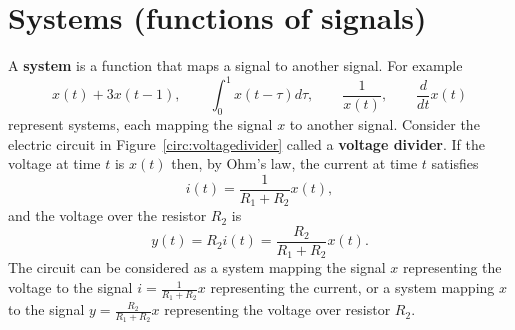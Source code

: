 \documentclass[11pt,a4paper]{book}
\theoremstyle{plain}
\numberwithin{equation}{section}
\newcommand{\term}{\textbf}
\newcommand{\abs}[1]{\left\vert #1 \right\vert}
\begin{document}






\section{Systems (functions of signals)}

A \term{system} is a function that maps a signal to another signal.  For example
\[
x(t) + 3 x(t-1), \qquad \int_{0}^{1} x(t - \tau) d\tau, \qquad \frac{1}{x(t)}, \qquad \frac{d}{dt} x(t)
\]
represent systems, each mapping the signal $x$ to another signal. Consider the electric circuit in Figure~\ref{circ:voltagedivider} called a \term{voltage divider}.  If the voltage at time $t$ is $x(t)$ then, by Ohm's law, the current at time $t$ satisfies
\[
i(t) = \frac{1}{R_1 + R_2} x(t),
\]
and the voltage over the resistor $R_2$ is
\begin{equation}\label{eq:voltagedivider}
y(t) = R_2 i(t) = \frac{R_2}{R_1 + R_2} x(t).
\end{equation}
The circuit can be considered as a system mapping the signal $x$ representing the voltage to the signal $i = \tfrac{1}{R_1+R_2}x$ representing the current, or a system mapping $x$ to the signal $y=\frac{R_2}{R_1 + R_2}x$ representing the voltage over resistor $R_2$.
\end{document}
